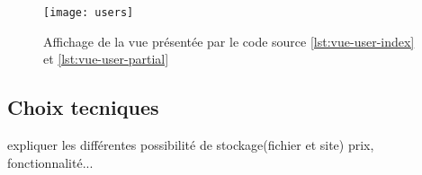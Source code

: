 \begin{figure}
  \begin{center}
    \texttt{[image: users]}
    \caption{Affichage de la vue présentée par le code source \ref{lst:vue-user-index} et \ref{lst:vue-user-partial}}
    \label{fig:vue-users}
  \end{center}
\end{figure}

\subsection{Choix tecniques}
expliquer les différentes possibilité de stockage(fichier et site) prix, fonctionnalité...
